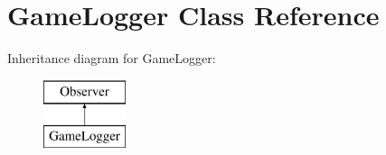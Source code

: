 \hypertarget{class_game_logger}{}\section{Game\+Logger Class Reference}
\label{class_game_logger}
Inheritance diagram for Game\+Logger\+:\begin{figure}[H]
\begin{center}
\leavevmode
\includegraphics[height=2.000000cm]{class_game_logger}
\end{center}
\end{figure}
